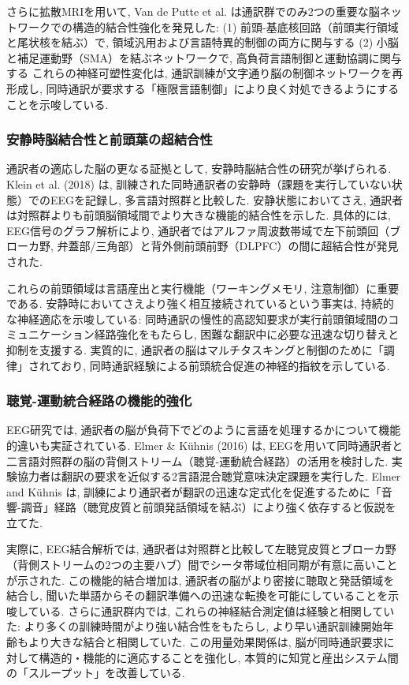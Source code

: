 さらに拡散MRIを用いて, Van de Putte et al. は通訳群でのみ2つの重要な脳ネットワークでの構造的結合性強化を発見した:
(1) 前頭-基底核回路（前頭実行領域と尾状核を結ぶ）で, 領域汎用および言語特異的制御の両方に関与する
(2) 小脳と補足運動野（SMA）を結ぶネットワークで, 高負荷言語制御と運動協調に関与する
これらの神経可塑性変化は, 通訳訓練が文字通り脳の制御ネットワークを再形成し, 同時通訳が要求する「極限言語制御」により良く対処できるようにすることを示唆している.

\subsubsection{安静時脳結合性と前頭葉の超結合性}

通訳者の適応した脳の更なる証拠として, 安静時脳結合性の研究が挙げられる.
Klein et al. (2018) \cite{klein2018interpreter}は, 訓練された同時通訳者の安静時（課題を実行していない状態）でのEEGを記録し, 多言語対照群と比較した.
安静状態においてさえ, 通訳者は対照群よりも前頭脳領域間でより大きな機能的結合性を示した.
具体的には, EEG信号のグラフ解析により, 通訳者ではアルファ周波数帯域で左下前頭回（ブローカ野, 弁蓋部/三角部）と背外側前頭前野（DLPFC）の間に超結合性が発見された.

これらの前頭領域は言語産出と実行機能（ワーキングメモリ, 注意制御）に重要である.
安静時においてさえより強く相互接続されているという事実は, 持続的な神経適応を示唆している:
同時通訳の慢性的高認知要求が実行前頭領域間のコミュニケーション経路強化をもたらし, 困難な翻訳中に必要な迅速な切り替えと抑制を支援する.
実質的に, 通訳者の脳はマルチタスキングと制御のために「調律」されており, 同時通訳経験による前頭統合促進の神経的指紋を示している.

\subsubsection{聴覚-運動統合経路の機能的強化}

EEG研究では, 通訳者の脳が負荷下でどのように言語を処理するかについて機能的違いも実証されている.
Elmer \& Kühnis (2016) \cite{elmer2016functional}は, EEGを用いて同時通訳者と二言語対照群の脳の背側ストリーム（聴覚-運動統合経路）の活用を検討した.
実験協力者は翻訳の要求を近似する2言語混合聴覚意味決定課題を実行した.
Elmer and Kühnis は, 訓練により通訳者が翻訳の迅速な定式化を促進するために「音響-調音」経路（聴覚皮質と前頭発話領域を結ぶ）により強く依存すると仮説を立てた.

実際に, EEG結合解析では, 通訳者は対照群と比較して左聴覚皮質とブローカ野（背側ストリームの2つの主要ハブ）間でシータ帯域位相同期が有意に高いことが示された.
この機能的結合増加は, 通訳者の脳がより密接に聴取と発話領域を結合し, 聞いた単語からその翻訳準備への迅速な転換を可能にしていることを示唆している.
さらに通訳群内では, これらの神経結合測定値は経験と相関していた: より多くの訓練時間がより強い結合性をもたらし, より早い通訳訓練開始年齢もより大きな結合と相関していた.
この用量効果関係は, 脳が同時通訳要求に対して構造的・機能的に適応することを強化し, 本質的に知覚と産出システム間の「スループット」を改善している.

